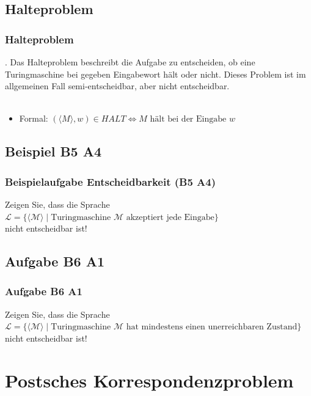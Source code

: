 \subsection{Halteproblem}
\begin{frame}
	\frametitle{Halteproblem}.
	Das Halteproblem beschreibt die Aufgabe zu entscheiden, ob eine Turingmaschine bei gegeben Eingabewort hält oder nicht. Dieses Problem ist im allgemeinen Fall semi-entscheidbar, aber nicht entscheidbar.~\\~\\
	\begin{itemize}
		\item Formal: $(\langle M\rangle, w) \in HALT \Leftrightarrow M \text{ hält bei der Eingabe } w$
	\end{itemize}
\end{frame}
\subsection{Beispiel B5 A4}
\begin{frame}
	\frametitle{Beispielaufgabe Entscheidbarkeit (B5 A4)}
	Zeigen Sie, dass die Sprache \\ $\mathcal{L} = \{ \langle \mathcal{M} \rangle \; | \; \mbox{Turingmaschine $\mathcal{M}$ akzeptiert jede Eingabe} \}$ \\ nicht entscheidbar ist!
\end{frame}
\subsection{Aufgabe B6 A1}
\begin{frame}
	\frametitle{Aufgabe B6 A1}
	Zeigen Sie, dass die Sprache \\ $\mathcal{L} = \{\langle\mathcal{M}\rangle \; | \; \mbox{Turingmaschine $\mathcal{M}$ hat mindestens einen unerreichbaren Zustand}\}$ \\ nicht entscheidbar ist!
\end{frame}

\section{Postsches Korrespondenzproblem}
